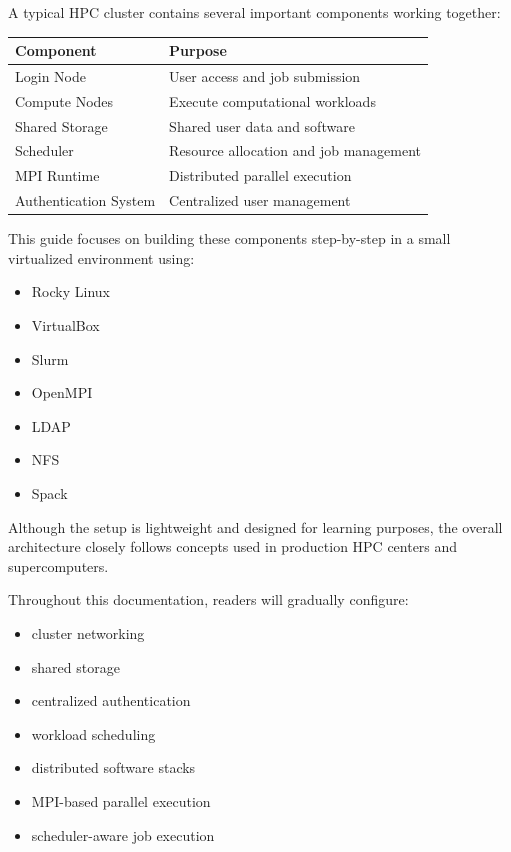 \documentclass[11pt]{article}
\begin{document}
A typical HPC cluster contains several important components working
together:

\begin{center}
\begin{tabular}{ll}
Component & Purpose\\
\hline
Login Node & User access and job submission\\
Compute Nodes & Execute computational workloads\\
Shared Storage & Shared user data and software\\
Scheduler & Resource allocation and job management\\
MPI Runtime & Distributed parallel execution\\
Authentication System & Centralized user management\\
\end{tabular}
\end{center}

This guide focuses on building these components step-by-step in a small
virtualized environment using:

\begin{itemize}
\item Rocky Linux
\item VirtualBox
\item Slurm
\item OpenMPI
\item LDAP
\item NFS
\item Spack
\end{itemize}

Although the setup is lightweight and designed for learning purposes,
the overall architecture closely follows concepts used in production HPC
centers and supercomputers.

Throughout this documentation, readers will gradually configure:

\begin{itemize}
\item cluster networking
\item shared storage
\item centralized authentication
\item workload scheduling
\item distributed software stacks
\item MPI-based parallel execution
\item scheduler-aware job execution
\end{itemize}
\end{document}

